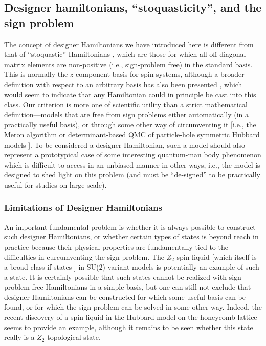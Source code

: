 \documentclass[range]{ar2e}
\begin{document}
\subsection{Designer hamiltonians, ``stoquasticity'', and the sign problem}

The concept of designer Hamiltonians we have introduced here is different from that of ``stoquastic'' Hamiltonians \cite{Terhal08}, which are
those for which all off-diagonal matrix elements are non-positive (i.e., sign-problem free) in the standard basis.  This is normally the  $z$-component 
basis for spin systems, although a broader definition with respect to an arbitrary basis has also been presented \cite{Terhal09}, which would seem to 
indicate that any Hamiltonian could in principle be cast into this class. Our criterion is more one of scientific utility than a strict mathematical 
definition---models that are free from sign problems either automatically (in a practically useful basis), or through some 
other way of circumventing it [i.e., the Meron algorithm \cite{Chandrasekharan99} or determinant-based QMC of particle-hole symmetric Hubbard 
models \cite{White89,Assaad05,Assaad07}]. To be considered a designer Hamiltonian, such a model should also represent a prototypical case of 
some interesting quantum-man body phenomenon which is difficult to access in an unbiased manner in other ways, i.e., the model is designed to shed
light on this problem (and must be ``de-signed'' to be practically useful for studies on large scale).

\subsubsection{Limitations of Designer Hamiltonians}

An important fundamental problem is whether it is always possible to construct such designer Hamiltonians, or whether certain types of 
states is beyond reach in practice because their physical properties are fundamentally tied to the difficulties in curcumventing the sign problem. 
The $Z_2$ spin liquid [which itself is a broad class if states \cite{Wen03}] in SU($2$) variant models is potentially an example of such a state. 
It is certainly possible that such states cannot be realized with sign-problem free Hamiltonians in a simple basis, but one can still not exclude that 
designer Hamiltonians can be constructed for which some useful basis can be found, or for which the sign problem can be solved in some other way.
Indeed, the recent discovery of a spin liquid in the Hubbard model on the honeycomb lattice \cite{Meng10} seems to provide an example, although it 
remains to be seen whether this state really is a $Z_2$ topological state.
\end{document}
